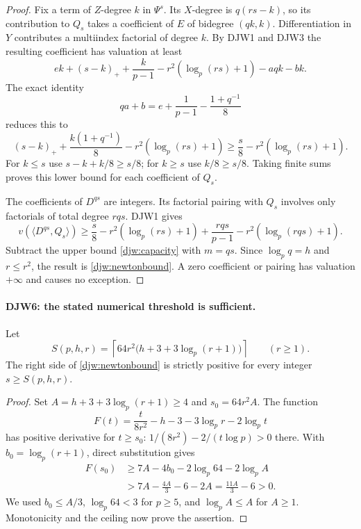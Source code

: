 \begin{proof}
Fix a term of $Z$-degree $k$ in $\Psi^s$.
Its $X$-degree is $q(rs-k)$, so its contribution to $Q_s$ takes
a coefficient of $E$ of bidegree $(qk,k)$.
Differentiation in $Y$ contributes a multiindex factorial of
degree $k$.  By DJW1 and DJW3 the resulting coefficient has
valuation at least
\[
 ek+(s-k)_++\frac{k}{p-1}
       -r^2(\log_p(rs)+1)-aqk-bk.
\]
The exact identity
\[
 qa+b=e+\frac1{p-1}-\frac{1+q^{-1}}8
\]
reduces this to
\[
 (s-k)_++\frac{k(1+q^{-1})}{8}
       -r^2(\log_p(rs)+1)
 \ge \frac s8-r^2(\log_p(rs)+1).
\]
For $k\le s$ use $s-k+k/8\ge s/8$; for $k\ge s$ use
$k/8\ge s/8$.  Taking finite sums proves this lower bound for
each coefficient of $Q_s$.

The coefficients of $D^{qs}$ are integers.  Its factorial pairing
with $Q_s$ involves only factorials of total degree $rqs$.
DJW1 gives
\[
 v(\langle D^{qs},Q_s\rangle)
 \ge \frac s8-r^2(\log_p(rs)+1)
       +\frac{rqs}{p-1}-r^2(\log_p(rqs)+1).
\]
Subtract the upper bound \eqref{djw:capacity} with $m=qs$.
Since $\log_pq=h$ and $r\le r^2$, the result is
\eqref{djw:newtonbound}.  A zero coefficient or pairing has
valuation $+\infty$ and causes no exception.
\end{proof}

\paragraph{DJW6: the stated numerical threshold is sufficient.}
\label{claim:DJW6}
Let
\begin{equation}
 S(p,h,r)=\left\lceil64r^2
          \bigl(h+3+3\log_p(r+1)\bigr)\right\rceil
          \qquad(r\ge1).
 \label{djw:windowlength}
\end{equation}
The right side of \eqref{djw:newtonbound} is strictly positive
for every integer $s\ge S(p,h,r)$.

\begin{proof}
Set $A=h+3+3\log_p(r+1)\ge4$ and $s_0=64r^2A$.
The function
\[
 F(t)=\frac{t}{8r^2}-h-3-3\log_p r-2\log_p t
\]
has positive derivative for $t\ge s_0$:
$1/(8r^2)-2/(t\log p)>0$ there.
With $b_0=\log_p(r+1)$, direct substitution gives
\begin{align*}
 F(s_0)&\ge7A-4b_0-2\log_p64-2\log_pA\\
       &>7A-\frac{4A}{3}-6-2A
        =\frac{11A}{3}-6>0.
\end{align*}
We used $b_0\le A/3$, $\log_p64<3$ for $p\ge5$, and
$\log_pA\le A$ for $A\ge1$.  Monotonicity and the ceiling
now prove the assertion.
\end{proof}

